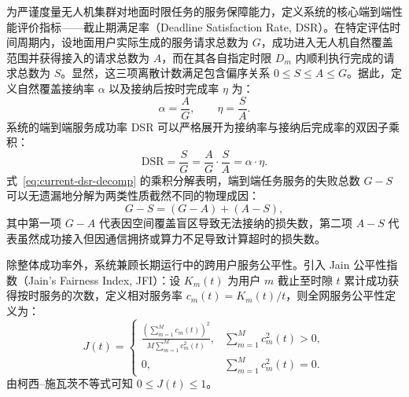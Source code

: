 为严谨度量无人机集群对地面时限任务的服务保障能力，定义系统的核心端到端性能评价指标——截止期满足率（Deadline Satisfaction Rate, DSR）。在特定评估时间周期内，设地面用户实际生成的服务请求总数为 $G$，成功进入无人机自然覆盖范围并获得接入的请求总数为 $A$，而在其各自指定时限 $D_m$ 内顺利执行完成的请求总数为 $S$。显然，这三项离散计数满足包含偏序关系 $0 \leq S \leq A \leq G$。据此，定义自然覆盖接纳率 $\alpha$ 以及接纳后按时完成率 $\eta$ 为：
\begin{equation}
    \alpha = \frac{A}{G}, \qquad \eta = \frac{S}{A}.
    \label{eq:alpha-eta-def}
\end{equation}
系统的端到端服务成功率 DSR 可以严格展开为接纳率与接纳后完成率的双因子乘积：
\begin{equation}
    \mathrm{DSR} = \frac{S}{G} = \frac{A}{G} \cdot \frac{S}{A} = \alpha \cdot \eta.
    \label{eq:current-dsr-decomp}
\end{equation}
式~\eqref{eq:current-dsr-decomp} 的乘积分解表明，端到端任务服务的失败总数 $G-S$ 可以无遗漏地分解为两类性质截然不同的物理成因：
\begin{equation}
    G - S = (G - A) + (A - S),
    \label{eq:ch3-failure-counts}
\end{equation}
其中第一项 $G-A$ 代表因空间覆盖盲区导致无法接纳的损失数，第二项 $A-S$ 代表虽然成功接入但因通信拥挤或算力不足导致计算超时的损失数。

除整体成功率外，系统兼顾长期运行中的跨用户服务公平性。引入 Jain 公平性指数（Jain's Fairness Index, JFI）：设 $K_m(t)$ 为用户 $m$ 截止至时隙 $t$ 累计成功获得按时服务的次数，定义相对服务率 $c_m(t) = K_m(t) / t$，则全网服务公平性定义为：
\begin{equation}
    J(t) = \begin{cases}
    \displaystyle \frac{\left(\sum_{m=1}^M c_m(t)\right)^2}{M \sum_{m=1}^M c_m^2(t)}, & \sum_{m=1}^M c_m^2(t) > 0,\\
    0, & \sum_{m=1}^M c_m^2(t) = 0.
    \end{cases}
    \label{eq:jfi}
\end{equation}
由柯西--施瓦茨不等式可知 $0 \leq J(t) \leq 1$。

